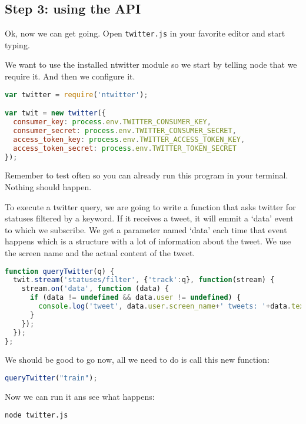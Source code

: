 \documentclass[a4paper]{report}
\begin{document}
\subsection*{Step 3: using the API}
Ok, now we can get going. Open \texttt{twitter.js} in your favorite editor and start typing.

We want to use the installed ntwitter module so we start by telling node that we require it. And then we configure it.

\begin{lstlisting}[language=JavaScript]
var twitter = require('ntwitter');

var twit = new twitter({
  consumer_key: process.env.TWITTER_CONSUMER_KEY,
  consumer_secret: process.env.TWITTER_CONSUMER_SECRET,
  access_token_key: process.env.TWITTER_ACCESS_TOKEN_KEY,
  access_token_secret: process.env.TWITTER_TOKEN_SECRET
});
\end{lstlisting}

\noindent Remember to test often so you can already run this program in your terminal. Nothing should happen.

\noindent To execute a twitter query, we are going to write a function that asks twitter for statuses filtered by a keyword. If it receives a tweet, it will emmit a `data' event to which we subscribe. We get a parameter named `data' each time that event happens which is a structure with a lot of information about the tweet. We use the screen name and the actual content of the tweet.

\begin{lstlisting}[language=JavaScript]
function queryTwitter(q) { 
  twit.stream('statuses/filter', {'track':q}, function(stream) {
    stream.on('data', function (data) {
      if (data != undefined && data.user != undefined) {
        console.log('tweet', data.user.screen_name+' tweets: '+data.text);
      }
    });
  });
};
\end{lstlisting}

\noindent We should be good to go now, all we need to do is call this new function:

\begin{lstlisting}[language=JavaScript]
queryTwitter("train");
\end{lstlisting}

\noindent Now we can run it ans see what happens:
\begin{lstlisting}[language=bash]
node twitter.js
\end{lstlisting}
\end{document}
